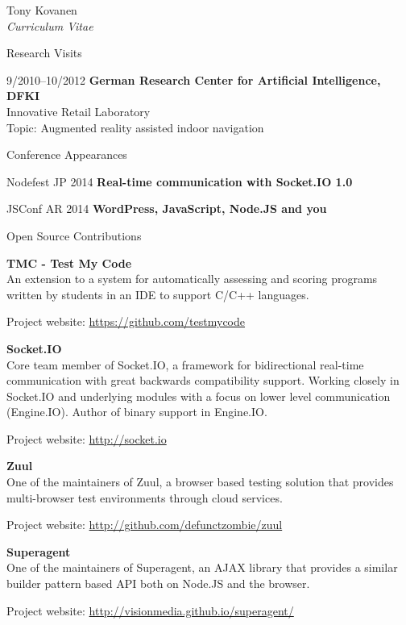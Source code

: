 \documentclass[10pt]{article}
\begin{document}
\begin{cv}{Tony Kovanen\\{\large \itshape Curriculum Vitae}}
\begin{cvlist}{Research Visits}
	\item[9/2010--10/2012] {\bf German Research Center for Artificial Intelligence, DFKI}\\		
		Innovative Retail Laboratory\\	
		Topic: Augmented reality assisted indoor navigation
\end{cvlist}

\begin{cvlist}{Conference Appearances}
	\item[Nodefest JP 2014]      {\bf Real-time communication with Socket.IO 1.0}\\
	\item[JSConf AR 2014] {\bf WordPress, JavaScript, Node.JS and you}\\
\end{cvlist}

\begin{cvlist}{Open Source Contributions}
	\item \textbf{TMC - Test My Code}\\
    An extension to a system for automatically assessing and scoring programs written by students in an IDE to support C/C++ languages. 
	\item Project website: \url{https://github.com/testmycode}	

	\item \textbf{Socket.IO}\\
    Core team member of Socket.IO, a framework for bidirectional real-time communication with great backwards compatibility support. Working closely in Socket.IO and underlying modules with a focus on lower level communication (Engine.IO). Author of binary support in Engine.IO.
	\item Project website: \url{http://socket.io}	

	\item \textbf{Zuul}\\
    One of the maintainers of Zuul, a browser based testing solution that provides multi-browser test environments through cloud services.
	\item Project website: \url{http://github.com/defunctzombie/zuul}	

	\item \textbf{Superagent}\\
    One of the maintainers of Superagent, an AJAX library that provides a similar builder pattern based API both on Node.JS and the browser.
	\item Project website: \url{http://visionmedia.github.io/superagent/}	


\end{cvlist}
\end{cv}
\end{document}
